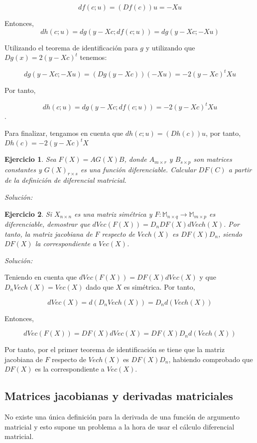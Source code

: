 \documentclass{article}
\theoremstyle{theorem-style}  %
\theoremstyle{definition-style}
\theoremstyle{example-style}
\theoremstyle{exercise-style}
\newtheorem{exercise}{Ejercicio}[section]
\begin{document}
	$$ df(c;u) = (Df(c))u = -X u$$
	
	Entonces,
	$$  dh(c;u) = dg(y - Xc; df(c;u)) = dg( y -Xc; -Xu)$$
	
	
	Utilizando el teorema de identificación para $g$ y utilizando que $Dg(x) = 2(y- Xc)^t$  tenemos:
	
	$$ dg(y - Xc ; -Xu) = (Dg(y - Xc))(-Xu) =  -2 (y - Xc)^t Xu$$
	
	Por tanto,
	
	$$ dh(c;u) = dg(y - Xc; df(c;u)) = -2(y - Xc)^tXu$$.
	
	Para finalizar, tengamos en cuenta que $dh(c;u) = (Dh(c))u$, por tanto, $Dh(c) = -2(y - Xc)^tX$
	
	\begin{exercise}
		Sea $F(X)=AG(X)B$, donde $A_{m\times r}$ y $B_{s\times p}$ son matrices constantes y $G(X)_{r\times s}$ es una función diferenciable. Calcular $DF(C)$ a partir de la definición de diferencial matricial.
	\end{exercise}
	\textit{Solución:}
	
	\begin{exercise}
		Si $X_{n\times n}$ es una matriz simétrica y $F: \mathbb{M}_{n\times q} \rightarrow \mathbb{M}_{m\times p}$ es diferenciable, demostrar que $dVec(F(X)) = D_nDF(X)dVech(X)$. Por tanto, la matriz jacobiana de $F$ respecto de $Vech(X)$ es $DF(X)D_n$, siendo $DF(X)$ la correspondiente a $Vec(X)$.
		
	\end{exercise}
	\textit{Solución:}
	
	Teniendo en cuenta que $dVec(F(X)) = DF(X) dVec(X)$ y que $D_n Vech(X) = Vec(X)$ dado que $X$ es simétrica. Por tanto,
	
	$$ dVec(X) = d(D_n Vech(X)) = D_n d(Vech(X))$$
	
	Entonces,
	
	$$d Vec (F(X)) = DF(X) d Vec(X) = DF(X)D_n d(Vech(X))$$
	
	Por tanto, por el primer teorema de identificación se tiene que la matriz jacobiana de $F$ respecto de $Vech(X)$ es $DF(X)D_n$,  habiendo comprobado que $DF(X)$ es la correspondiente a $Vec(X)$. 
	
	
	\subsection{Matrices jacobianas y derivadas matriciales}
	
	No existe una única definición para la derivada de una función de argumento matricial y esto supone un problema a la hora de usar el cálculo diferencial matricial.
	
\end{document}

